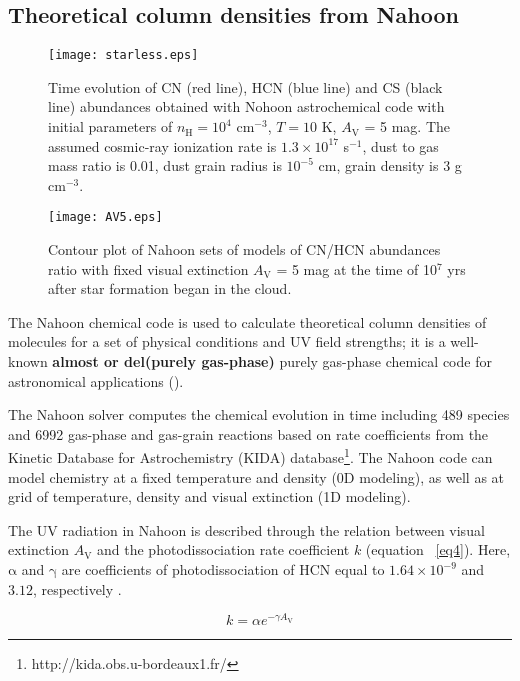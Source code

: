 \documentclass{aa}
\begin{document}
\subsection{Theoretical column densities from Nahoon}
\begin{figure} 
\centering 
\texttt{[image: starless.eps]} 
\caption{Time evolution of CN
(red line), HCN (blue line) and CS (black line) abundances obtained with Nohoon astrochemical code
with initial parameters of $n_\mathrm{H} = 10^4$ cm$^{-3}$, $T = 10$ K, $A_\mathrm{V}$ =
5 mag. The assumed cosmic-ray ionization rate is $1.3\times10^{17}$ s$^{-1}$, dust to gas mass ratio
is 0.01, dust grain radius is $10^{-5}$ cm, grain density is 3 g cm$^{-3}$.} 
\label{starless}
\end{figure}
\begin{figure} 
\centering 
\texttt{[image: AV5.eps]} 
\caption{Contour plot of Nahoon sets
of models of CN/HCN abundances ratio with fixed visual extinction $A_\mathrm{V}$ = 5 mag at the time
of 10$^{7}$ yrs after star formation began in the cloud.} 
\label{AV5} 
\end{figure}
The Nahoon chemical code is used to calculate theoretical column densities of 
molecules for a set of physical conditions and UV field strengths; it is a well-known
\textbf{almost or del(purely gas-phase)} purely gas-phase chemical code for astronomical applications (\citealt{Wak12}). 

The Nahoon solver computes the chemical evolution in time including 489 species
and 6992 gas-phase and gas-grain reactions based on rate coefficients from the Kinetic
Database for Astrochemistry (KIDA) database\footnote{http://kida.obs.u-bordeaux1.fr/}. 
The Nahoon code can model chemistry at a fixed temperature and density (0D modeling),
 as well as at grid of temperature,
density and visual extinction (1D modeling). 

The UV radiation in Nahoon is described through the relation
between visual extinction $A_\mathrm{V}$ and the photodissociation rate coefficient $k$
(equation ~\ref{eq4}). Here, $\mathrm{\alpha}$ and $\mathrm{\gamma}$ are coefficients
 of photodissociation of HCN equal to $1.64\times10^{-9}$ and $3.12$, respectively \citep{Hea17}.

\begin{equation} \label{eq5} 
k = \alpha e^{-\gamma A_\mathrm{V}} 
\end{equation} 
\end{document}
